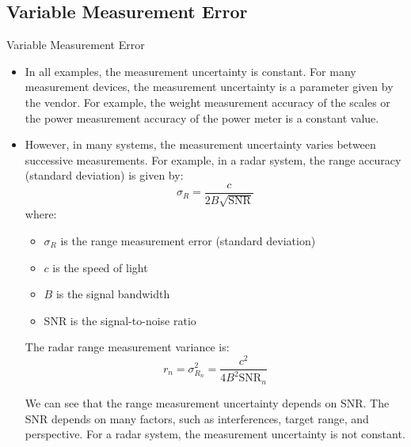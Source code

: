 \subsection{Variable Measurement Error}
\begin{frame}{Variable Measurement Error}
    \begin{itemize}
        \item In all examples, the measurement uncertainty is constant. For many measurement devices, the measurement uncertainty is a parameter given by the vendor. For example, the weight measurement accuracy of the scales or the power measurement accuracy of the power meter is a constant value.
        \item However, in many systems, the measurement uncertainty varies between successive measurements. For example, in a radar system, the range accuracy (standard deviation) is given by:
        \begin{equation*}
        \sigma_R = \frac{c}{2B \sqrt{\text{SNR}}}
        \end{equation*}
    where:
    \begin{itemize}
        \item \( \sigma_R \) is the range measurement error (standard deviation)
        \item \( c \) is the speed of light
        \item \( B \) is the signal bandwidth
        \item SNR is the signal-to-noise ratio
    \end{itemize}
    The radar range measurement variance is:
    \begin{equation*}
    r_n = \sigma^2_{R_n} = \frac{c^2}{4B^2 \text{SNR}_n}
    \end{equation*}
    
    We can see that the range measurement uncertainty depends on SNR. The SNR depends on many factors, such as interferences, target range, and perspective. For a radar system, the measurement uncertainty is not constant.

    \end{itemize}
\end{frame}



